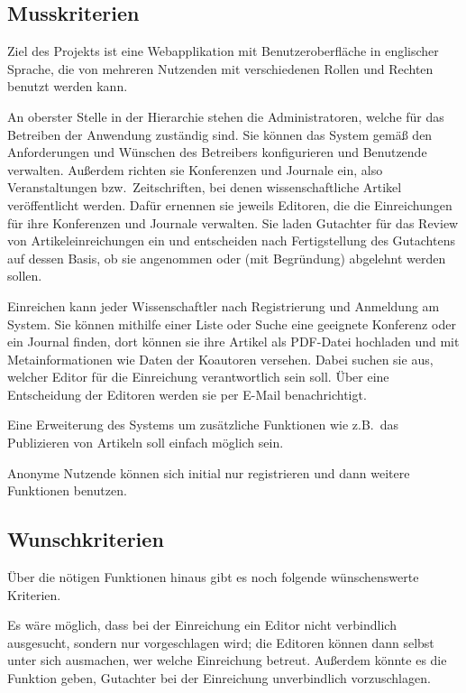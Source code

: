 
\subsection{Musskriterien}
Ziel des Projekts ist eine Webapplikation mit Benutzeroberfläche in englischer Sprache, die von mehreren Nutzenden mit verschiedenen Rollen und Rechten benutzt werden kann.

An oberster Stelle in der Hierarchie stehen die Administratoren, welche für das Betreiben der Anwendung zuständig sind.
Sie können das System gemäß den Anforderungen und Wünschen des Betreibers konfigurieren und Benutzende verwalten.
Außerdem richten sie Konferenzen und Journale ein, also Veranstaltungen bzw.\ Zeitschriften, bei denen wissenschaftliche Artikel veröffentlicht werden.
Dafür ernennen sie jeweils Editoren, die die Einreichungen für ihre Konferenzen und Journale verwalten.
Sie laden Gutachter für das Review von Artikeleinreichungen ein und entscheiden nach Fertigstellung des Gutachtens auf dessen Basis, ob sie angenommen oder (mit Begründung) abgelehnt werden sollen.

Einreichen kann jeder Wissenschaftler nach Registrierung und Anmeldung am System.
Sie können mithilfe einer Liste oder Suche eine geeignete Konferenz oder ein Journal finden,
dort können sie ihre Artikel als PDF-Datei hochladen und mit Metainformationen wie Daten der Koautoren versehen.
Dabei suchen sie aus, welcher Editor für die Einreichung verantwortlich sein soll.
Über eine Entscheidung der Editoren werden sie per E-Mail benachrichtigt.

Eine Erweiterung des Systems um zusätzliche Funktionen wie z.B.\ das Publizieren von Artikeln soll einfach möglich sein.

Anonyme Nutzende können sich initial nur registrieren und dann weitere Funktionen benutzen.

\subsection{Wunschkriterien}

Über die nötigen Funktionen hinaus gibt es noch folgende wünschenswerte Kriterien.

Es wäre möglich, dass bei der Einreichung ein Editor nicht verbindlich ausgesucht, sondern nur vorgeschlagen wird;
die Editoren können dann selbst unter sich ausmachen, wer welche Einreichung betreut.
Außerdem könnte es die Funktion geben, Gutachter bei der Einreichung unverbindlich vorzuschlagen.

